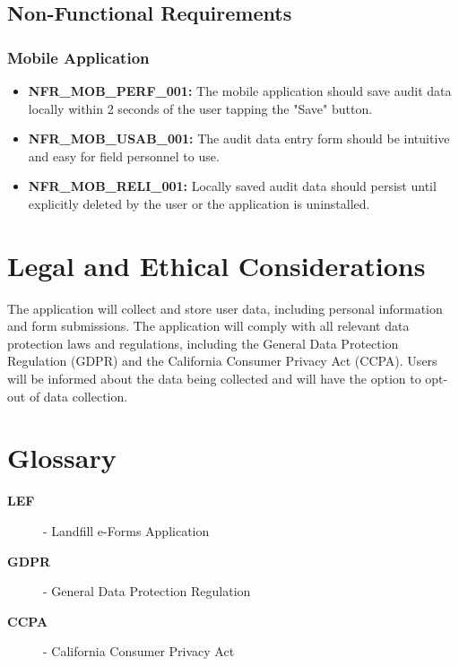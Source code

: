 \documentclass[12pt]{article}
\begin{document}
\subsection{Non-Functional Requirements}

\subsubsection{Mobile Application}

\begin{itemize}
    \item \textbf{NFR\_MOB\_PERF\_001:} The mobile application should save audit data locally within 2 seconds of the user tapping the "Save" button.
    \item \textbf{NFR\_MOB\_USAB\_001:} The audit data entry form should be intuitive and easy for field personnel to use.
    \item \textbf{NFR\_MOB\_RELI\_001:} Locally saved audit data should persist until explicitly deleted by the user or the application is uninstalled.
\end{itemize}

\newpage

\section{Legal and Ethical Considerations}
The application will collect and store user data, including personal information and form submissions. The application will comply with all relevant data protection laws and regulations, including the General Data Protection Regulation (GDPR) and the California Consumer Privacy Act (CCPA). Users will be informed about the data being collected and will have the option to opt-out of data collection.
\newpage

\section*{Glossary}
\begin{description}
    \item[\textbf{LEF}] - Landfill e-Forms Application
    \item[\textbf{GDPR}] - General Data Protection Regulation
    \item[\textbf{CCPA}] - California Consumer Privacy Act
\end{description}
\end{document}
